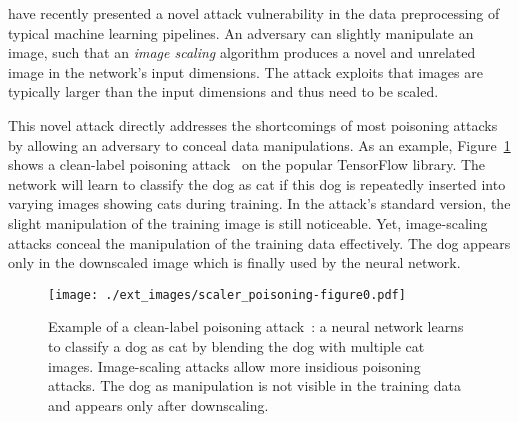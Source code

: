 \documentclass[conference]{IEEEtran}
\begin{document}
\citet{XiaCheShe+19} have recently presented a novel {attack\EndAccSupp{}} 
{vulnerability\EndAccSupp{}} in the data preprocessing of typical machine learning 
pipelines. An {adversary\EndAccSupp{}} can slightly manipulate an image, such that an
\emph{image scaling} algorithm {produces\EndAccSupp{}} a novel and unrelated image in 
the network's {input\EndAccSupp{}} dimensions. The attack exploits that images are 
typically larger than the input dimensions and thus need to be scaled.

This novel attack directly addresses the shortcomings of 
most poisoning attacks by {allowing\EndAccSupp{}} an {adversary\EndAccSupp{}} to conceal data 
manipulations. As an {example\EndAccSupp{}}, Figure~\ref{fig:intro_example_poisoning} 
shows a clean-label poisoning attack~\citep{ShaHuaNaj+18} on the 
popular TensorFlow library. The network will learn to classify 
the dog as cat if this dog is repeatedly inserted into 
varying images showing cats during training.
In the attack's {standard\EndAccSupp{}} version, the slight manipulation of the 
training image is still noticeable. Yet, image-scaling attacks conceal 
the manipulation of the training data effectively. The dog appears only 
in the downscaled image which is finally {used\EndAccSupp{}} by the {neural\EndAccSupp{}} network.



\begin{figure}[t]
	\centering
	\texttt{[image: ./ext\_images/scaler\_poisoning-figure0.pdf]}
	\vspace{-0.59cm}
	\caption{Example of a clean-label poisoning 
	attack~\citep{ShaHuaNaj+18}: a neural network 
	learns to classify a dog as cat by blending the dog with multiple 
	cat images. Image-scaling attacks allow more insidious poisoning attacks.
	The dog as manipulation is not visible in the training data and 
	appears only after downscaling.
	}
	\label{fig:intro_example_poisoning}
\end{figure}
\end{document}
